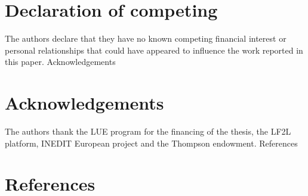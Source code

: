 \documentclass[
  12pt,
  number,
  review]{elsarticle}
\begin{document}
\hypertarget{declaration-of-competing}{%
\section*{Declaration of competing}\label{declaration-of-competing}}

The authors declare that they have no known competing financial interest
or personal relationships that could have appeared to influence the work
reported in this paper. Acknowledgements

\hypertarget{acknowledgements}{%
\section*{Acknowledgements}\label{acknowledgements}}

The authors thank the LUE program for the financing of the thesis, the
LF2L platform, INEDIT European project and the Thompson endowment.
References

\newpage

\hypertarget{references}{%
\section*{References}\label{references}}
\end{document}
